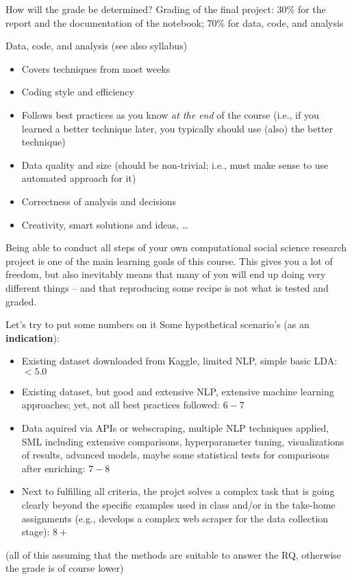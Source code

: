 \begin{frame}{How will the grade be determined?}
Grading of the final project: 30\% for the report and the documentation of the notebook; 70\% for data, code, and analysis


\begin{block}{Data, code, and analysis}
(see also syllabus)
\footnotesize
\begin{itemize}
\item Covers techniques from most weeks
\item Coding style and efficiency
\item Follows best practices as you know \emph{at the end} of the course (i.e., if you learned a better technique later, you typically should use (also) the better technique)
\item Data quality and size (should be non-trivial; i.e., must make sense to use automated approach for it)
\item Correctness of analysis and decisions
\item Creativity, smart solutions and ideas, \ldots
\end{itemize}
\end{block}

\end{frame}

\begin{frame}[standout]
Being able to conduct all steps of your own computational social science research project is one of the main learning goals of this course. This gives you a lot of freedom, but also inevitably means that many of you will end up doing very different things -- and that reproducing some recipe is not what is tested and graded.
\end{frame}

\begin{frame}{Let's try to put some numbers on it}
Some hypothetical scenario's (as an \textbf{indication}):
\footnotesize

\begin{itemize}[<+>]
\item Existing dataset downloaded from Kaggle, limited NLP, simple basic LDA: $<5.0$
\item Existing dataset, but good and extensive NLP, extensive machine learning approaches; yet, not all best practices followed: $6-7$
\item Data aquired via APIs or webscraping, multiple NLP techniques applied, SML including extensive comparisons, hyperparameter tuning, visualizations of results, advanced models, maybe some statistical tests for comparisons after enriching: $7-8$
\item Next to fulfilling all criteria, the projct solves a complex task that is going clearly beyond the specific examples used in class and/or in the take-home assignments (e.g., develops a complex web scraper for the data collection stage): $8+$
\end{itemize}
(all of this assuming that the methods are suitable to answer the RQ, otherwise the grade is of course lower)
\end{frame}


